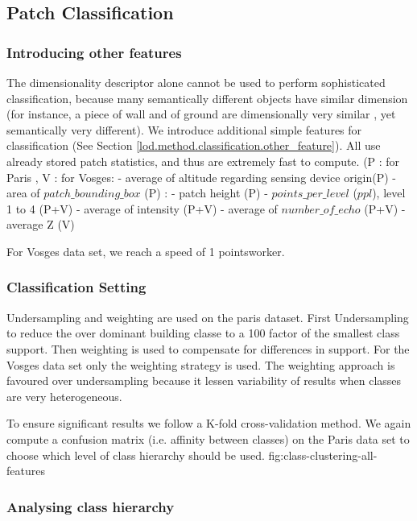 	\subsection{Patch Classification}
		\label{lod.result.classification}
		 
		\subsubsection{Introducing other features}
		The dimensionality descriptor alone cannot be used to perform sophisticated classification,
		because many semantically different objects have similar dimension 
		(for instance, a piece of wall and of ground are dimensionally very similar
		, yet semantically very different).
		We introduce additional simple features for classification (See Section \ref{lod.method.classification.other_feature}). All use already stored patch statistics, and thus are extremely fast to compute.
		(P : for Paris , V : for Vosges: 
		- average of altitude regarding sensing device origin(P)
		- area of $patch\_bounding\_box$ (P) : 
		- patch height (P)
		- $points\_per\_level$ ($ppl$), level 1 to 4 (P+V)
		- average of intensity (P+V)
		- average of $number\_of\_echo$ (P+V) 
		- average Z (V)
		
		For Vosges data set, we reach a speed of 1 \mega points\per \second \per worker.
		\subsubsection{Classification Setting} 
		Undersampling and weighting are used on the paris dataset. First Undersampling to reduce the over dominant building classe to a 100 factor of the smallest class support. Then weighting is used to compensate for differences in support. 
		For the Vosges data set only the weighting strategy is used. 
		The weighting approach is favoured over undersampling because it lessen variability of results when classes are very heterogeneous.
		
		To ensure significant results we follow a K-fold cross-validation method. We again compute a confusion matrix (i.e. affinity between classes) on the Paris data set to choose which level of class hierarchy should be used.
		fig:class-clustering-all-features
		
		
		\subsubsection{Analysing class hierarchy} 
		

